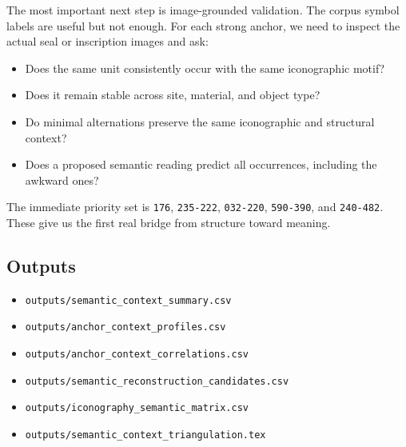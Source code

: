 The most important next step is image-grounded validation. The corpus symbol labels are useful but not enough. For each strong anchor, we need to inspect the actual seal or inscription images and ask:

\begin{itemize}
  \item Does the same unit consistently occur with the same iconographic motif?
  \item Does it remain stable across site, material, and object type?
  \item Do minimal alternations preserve the same iconographic and structural context?
  \item Does a proposed semantic reading predict all occurrences, including the awkward ones?
\end{itemize}

The immediate priority set is \texttt{176}, \texttt{235-222}, \texttt{032-220}, \texttt{590-390}, and \texttt{240-482}. These give us the first real bridge from structure toward meaning.

\subsection{Outputs}

\begin{itemize}
  \item \texttt{outputs/semantic\_context\_summary.csv}
  \item \texttt{outputs/anchor\_context\_profiles.csv}
  \item \texttt{outputs/anchor\_context\_correlations.csv}
  \item \texttt{outputs/semantic\_reconstruction\_candidates.csv}
  \item \texttt{outputs/iconography\_semantic\_matrix.csv}
  \item \texttt{outputs/semantic\_context\_triangulation.tex}
\end{itemize}

